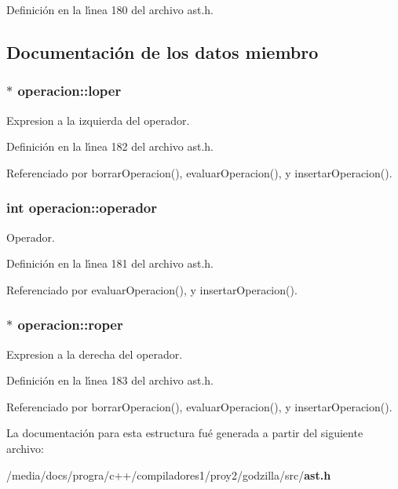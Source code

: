 Definici\'{o}n en la l\'{\i}nea 180 del archivo ast.h.

\subsection{Documentaci\'{o}n de los datos miembro}
\subsubsection{$\ast$ {\bf operacion::loper}}\label{structoperacion_o1}


Expresion a la izquierda del operador. 



Definici\'{o}n en la l\'{\i}nea 182 del archivo ast.h.

Referenciado por borrar\-Operacion(), evaluar\-Operacion(), y insertar\-Operacion().
\subsubsection{\setlength{\rightskip}{0pt plus 5cm}int {\bf operacion::operador}}\label{structoperacion_o0}


Operador. 



Definici\'{o}n en la l\'{\i}nea 181 del archivo ast.h.

Referenciado por evaluar\-Operacion(), y insertar\-Operacion().
\subsubsection{$\ast$ {\bf operacion::roper}}\label{structoperacion_o2}


Expresion a la derecha del operador. 



Definici\'{o}n en la l\'{\i}nea 183 del archivo ast.h.

Referenciado por borrar\-Operacion(), evaluar\-Operacion(), y insertar\-Operacion().

La documentaci\'{o}n para esta estructura fu\'{e} generada a partir del siguiente archivo:\begin{CompactItemize}
\item 
/media/docs/progra/c++/compiladores1/proy2/godzilla/src/{\bf ast.h}\end{CompactItemize}

